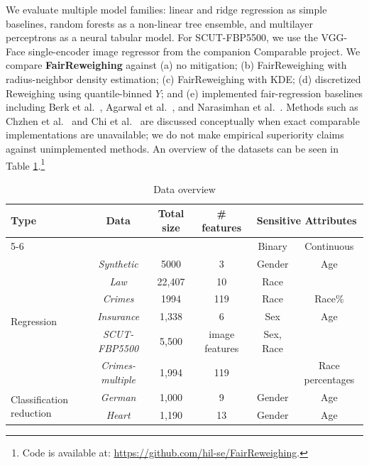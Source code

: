 We evaluate multiple model families: linear and ridge regression as simple baselines, random forests as a non-linear tree ensemble, and multilayer perceptrons as a neural tabular model. For SCUT-FBP5500, we use the VGG-Face single-encoder image regressor from the companion Comparable project. We compare \textbf{FairReweighing} against (a) no mitigation; (b) FairReweighing with radius-neighbor density estimation; (c) FairReweighing with KDE; (d) discretized Reweighing using quantile-binned $Y$; and (e) implemented fair-regression baselines including Berk et al.~\cite{berk2017convex}, Agarwal et al.~\cite{agarwal2019fair}, and Narasimhan et al.~\cite{narasimhan2020pairwise}. Methods such as Chzhen et al.~\cite{chzhen2020fair} and Chi et al.~\cite{chi2021understanding} are discussed conceptually when exact comparable implementations are unavailable; we do not make empirical superiority claims against unimplemented methods. An overview of the datasets can be seen in Table \ref{tab:data}.\footnote{Code is available at: \url{https://github.com/hil-se/FairReweighing}.}
\begin{table}[ht]
\small
  \setlength\tabcolsep{2pt}
    \setlength\extrarowheight{3pt}
  \caption{Data overview}
  \label{tab:data}
  \centering
  \begin{tabular}{l|c|c|c|c|c}
  \hline \multirow{2}{*}{Type} & \multirow{2}{*}{Data} & \multirow{2}{*}{Total size} & \multirow{2}{*}{\# features} & \multicolumn{2}{c}{Sensitive Attributes}  \\ \cline{5-6}
  &&&& Binary & Continuous\\
  \hline
  
  \multirow{6}{*}{Regression} & \emph{Synthetic} & 5000 & 3 & Gender & Age  \\ 
  
   & \emph{Law} & 22,407 & 10 & Race & \\ 

   & \emph{Crimes} & 1994 & 119 & Race & Race\%\\ 

   & \emph{Insurance} & 1,338 & 6 & Sex & Age\\

   & \emph{SCUT-FBP5500} & 5,500 & image features & Sex, Race & \\

   & \emph{Crimes-multiple} & 1,994 & 119 & & Race percentages\\ 

  \hline

  \multirow{2}{*}{Classification reduction} & \emph{German} & 1,000 & 9 & Gender & Age\\ 

   & \emph{Heart} & 1,190 & 13 & Gender & Age\\ 
  \hline
  \end{tabular}
\end{table}

